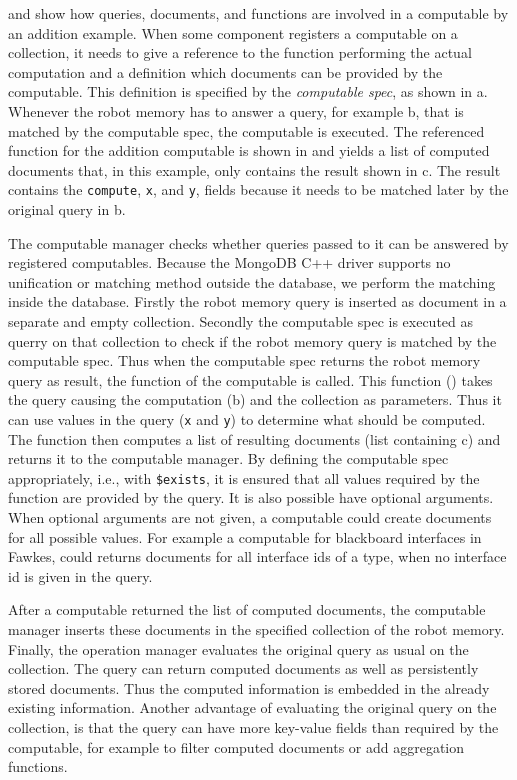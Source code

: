  and  show how queries,
documents, and functions are involved in a computable by an addition example.
When some component registers a computable
on a collection, it needs to give a reference to the function
performing the actual computation and a definition which documents can
be provided by the computable. This definition is specified by the
\emph{computable spec}, as shown in a. Whenever the
robot memory has to answer a query, for example b, that is
matched by the computable spec, the computable is executed. The
referenced function for the addition computable is shown in
 and yields a list of computed documents that,
in this example, only contains the result shown in
c. The result contains the \texttt{compute},
\texttt{x}, and \texttt{y}, fields because it needs to be matched
later by the original query in b.

The computable manager checks whether queries passed to it can be
answered by registered computables. Because the MongoDB C++ driver
supports no unification or matching method outside the database, we
perform the matching inside the database. Firstly the robot memory query is inserted
as document in a separate and empty collection. Secondly the
computable spec is executed as querry on that collection to check if the robot memory query
is matched by the computable spec. Thus when the computable spec
returns the robot memory query as result, the function of the computable is called. This function
() takes the query causing the computation
(b) and the collection as parameters. Thus it can use
values in the query (\texttt{x} and \texttt{y}) to determine what
should be computed. The function then computes a list of resulting
documents (list containing c) and returns it to the
computable manager. By defining the computable spec appropriately,
i.e., with \texttt{\$exists}, it is ensured that all values required
by the function are provided by the query. It is also possible have
optional arguments. When optional arguments are not given, a
computable could create documents for all possible values. For example a computable for
blackboard interfaces in Fawkes, could returns documents for all interface
ids of a type, when no interface id is given in the query.

After a computable returned the list of computed documents, the
computable manager inserts these documents in the specified collection
of the robot memory. Finally, the operation manager evaluates the
original query as usual on the collection. The query can return computed
documents as well as persistently stored documents. Thus the computed
information is embedded in the already existing information. Another
advantage of evaluating the original query on the collection, is that
the query can have more key-value fields than required by the
computable, for example to filter computed documents or add
aggregation functions.

